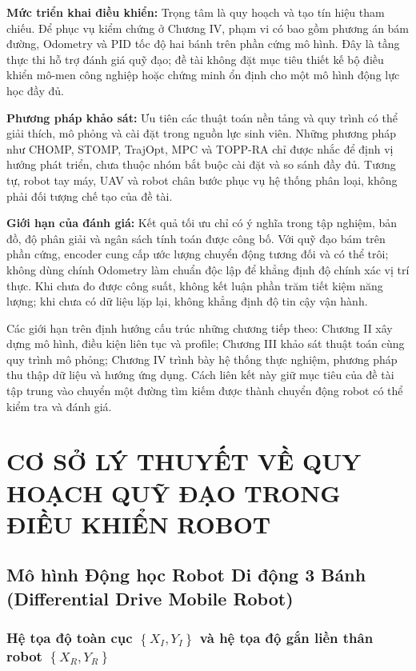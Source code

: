 \documentclass[12pt,a4paper,oneside]{report}
\begin{document}
\textbf{Mức triển khai điều khiển:} Trọng tâm là quy hoạch và tạo tín hiệu tham chiếu. Để phục vụ kiểm chứng ở Chương IV, phạm vi có bao gồm phương án bám đường, Odometry và PID tốc độ hai bánh trên phần cứng mô hình. Đây là tầng thực thi hỗ trợ đánh giá quỹ đạo; đề tài không đặt mục tiêu thiết kế bộ điều khiển mô-men công nghiệp hoặc chứng minh ổn định cho một mô hình động lực học đầy đủ.

\textbf{Phương pháp khảo sát:} Ưu tiên các thuật toán nền tảng và quy trình có thể giải thích, mô phỏng và cài đặt trong nguồn lực sinh viên. Những phương pháp như CHOMP, STOMP, TrajOpt, MPC và TOPP-RA chỉ được nhắc để định vị hướng phát triển, chưa thuộc nhóm bắt buộc cài đặt và so sánh đầy đủ. Tương tự, robot tay máy, UAV và robot chân bước phục vụ hệ thống phân loại, không phải đối tượng chế tạo của đề tài.

\textbf{Giới hạn của đánh giá:} Kết quả tối ưu chỉ có ý nghĩa trong tập nghiệm, bản đồ, độ phân giải và ngân sách tính toán được công bố. Với quỹ đạo bám trên phần cứng, encoder cung cấp ước lượng chuyển động tương đối và có thể trôi; không dùng chính Odometry làm chuẩn độc lập để khẳng định độ chính xác vị trí thực. Khi chưa đo được công suất, không kết luận phần trăm tiết kiệm năng lượng; khi chưa có dữ liệu lặp lại, không khẳng định độ tin cậy vận hành.

Các giới hạn trên định hướng cấu trúc những chương tiếp theo: Chương II xây dựng mô hình, điều kiện liên tục và profile; Chương III khảo sát thuật toán cùng quy trình mô phỏng; Chương IV trình bày hệ thống thực nghiệm, phương pháp thu thập dữ liệu và hướng ứng dụng. Cách liên kết này giữ mục tiêu của đề tài tập trung vào chuyển một đường tìm kiếm được thành chuyển động robot có thể kiểm tra và đánh giá.


\chapter{CƠ SỞ LÝ THUYẾT VỀ QUY HOẠCH QUỸ ĐẠO TRONG ĐIỀU KHIỂN ROBOT}

\setcounter{secnumdepth}{3}

\section{Mô hình Động học Robot Di động 3 Bánh (Differential Drive Mobile Robot)}

\subsection{\texorpdfstring{Hệ tọa độ toàn cục \(\left\{ X_{I},Y_{I} \right\}\) và hệ tọa độ gắn liền thân robot \(\left\{ X_{R},Y_{R} \right\}\)}{Hệ tọa độ toàn cục XI,YIvà hệ tọa độ gắn liền thân robot XR,YR}}
\end{document}
